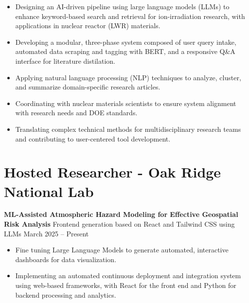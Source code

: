 \documentclass[10pt, letterpaper]{article}
\newenvironment{highlights}{
    \begin{itemize}[
        topsep=0.10 cm,
        parsep=0.10 cm,
        partopsep=0pt,
        itemsep=0pt,
        leftmargin=0 cm + 10pt
    ]
}{
    \end{itemize}
} %
\newenvironment{twocolentry}[2][]{
    \onecolentry
    \def\secondColumn{#2}
    \setcolumnwidth{\fill, 4.5 cm}
    \begin{paracol}{2}
}{
    \switchcolumn \raggedleft \secondColumn
    \end{paracol}
    \endonecolentry
} %
\begin{document}
\begin{highlights}
    \item Designing an AI-driven pipeline using large language models (LLMs) to enhance keyword-based search and retrieval for ion-irradiation research, with applications in nuclear reactor (LWR) materials.
    \item Developing a modular, three-phase system composed of user query intake, automated data scraping and tagging with BERT, and a responsive Q\&A interface for literature distilation.
    \item Applying natural language processing (NLP) techniques to analyze, cluster, and summarize domain-specific research articles.
    \item Coordinating with nuclear materials scientists to ensure system alignment with research needs and DOE standards.
    \item Translating complex technical methods for multidisciplinary research teams and contributing to user-centered tool development.
\end{highlights}

\vspace{0.3cm}




    \section*{Hosted Researcher - Oak Ridge National Lab}
    \small

    \vspace{0.3cm} \begin{twocolentry}{March 2025 – Present} \textbf{ML-Assisted Atmospheric Hazard Modeling for Effective Geospatial Risk Analysis} \textbar Frontend generation based on React and Tailwind CSS using LLMs \end{twocolentry}
    
    \begin{highlights}  
        \item Fine tuning Large Language Models to generate automated, interactive dashboards for data visualization.  
        \item Implementing an automated continuous deployment and integration system using web-based frameworks, with React for the front end and Python for backend processing and analytics.  
    \end{highlights}  
    
\end{document}
